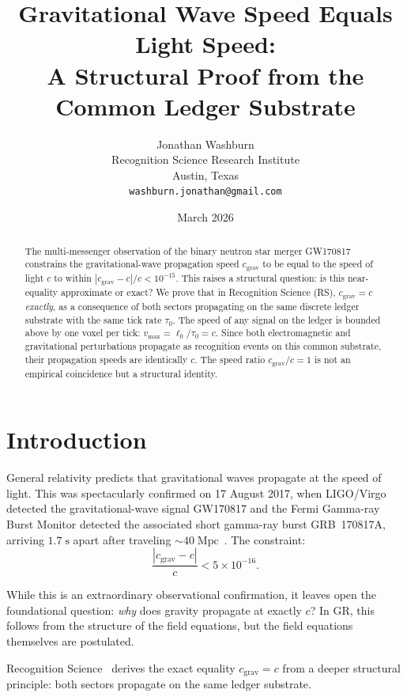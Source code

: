 \documentclass[12pt,a4paper]{article}
\title{Gravitational Wave Speed Equals Light Speed:\\
A Structural Proof from the Common Ledger Substrate}
\author{Jonathan Washburn\\
Recognition Science Research Institute\\
Austin, Texas\\
\texttt{washburn.jonathan@gmail.com}}
\date{March 2026}
\theoremstyle{definition}
\theoremstyle{remark}
\begin{document}
\maketitle

\begin{abstract}
The multi-messenger observation of the binary neutron star merger
GW170817 constrains the gravitational-wave propagation speed
$c_{\mathrm{grav}}$ to be equal to the speed of light $c$ to within
$|c_{\mathrm{grav}} - c|/c < 10^{-15}$.  This raises a structural
question: is this near-equality approximate or exact?  We prove that
in Recognition Science (RS), $c_{\mathrm{grav}} = c$ \emph{exactly},
as a consequence of both sectors propagating on the same discrete
ledger substrate with the same tick rate $\tau_0$.  The speed of any
signal on the ledger is bounded above by one voxel per tick:
$v_{\max} = \ell_0/\tau_0 = c$.  Since both electromagnetic and
gravitational perturbations propagate as recognition events on this
common substrate, their propagation speeds are identically $c$.  The
speed ratio $c_{\mathrm{grav}}/c = 1$ is not an empirical coincidence
but a structural identity.  \end{abstract}

\section{Introduction}

General relativity predicts that gravitational waves propagate at the
speed of light.  This was spectacularly confirmed on 17 August 2017,
when LIGO/Virgo detected the gravitational-wave signal GW170817 and
the Fermi Gamma-ray Burst Monitor detected the associated short
gamma-ray burst GRB~170817A, arriving $1.7\;\mathrm{s}$ apart after
traveling $\sim 40\;\mathrm{Mpc}$~\cite{GW170817}.  The constraint:
\begin{equation}
  \frac{|c_{\mathrm{grav}} - c|}{c} < 5 \times 10^{-16}.
\end{equation}

While this is an extraordinary observational confirmation, it leaves
open the foundational question: \emph{why} does gravity propagate at
exactly $c$?  In GR, this follows from the structure of the field
equations, but the field equations themselves are postulated.

Recognition Science~\cite{RS_Axioms} derives the exact equality
$c_{\mathrm{grav}} = c$ from a deeper structural principle: both
sectors propagate on the same ledger substrate.
\end{document}
